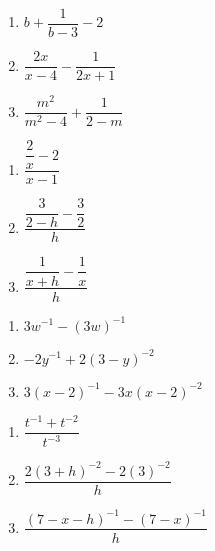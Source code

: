 \documentclass[11pt]{article}
\theoremstyle{definition}  %
\newcounter{HW}
\begin{document}
\begin{multicols}{3}
\begin{enumerate}
\setcounter{enumi}{\value{HW}}

\item  $b+ \dfrac{1}{b-3} - 2$
\item  $\dfrac{2x}{x-4} - \dfrac{1}{2x+1}$
\item  $\dfrac{m^2}{m^2-4} + \dfrac{1}{2-m}$

\setcounter{HW}{\value{enumi}}
\end{enumerate}
\end{multicols}

\begin{multicols}{3}
\begin{enumerate}
\setcounter{enumi}{\value{HW}}

\item $\dfrac{\dfrac{2}{x} - 2}{x-1}$
\item $\dfrac{\dfrac{3}{2-h} - \dfrac{3}{2}}{h}$
\item $\dfrac{\dfrac{1}{x+h} - \dfrac{1}{x}}{h}$

\setcounter{HW}{\value{enumi}}
\end{enumerate}
\end{multicols}


\begin{multicols}{3}
\begin{enumerate}
\setcounter{enumi}{\value{HW}}

\item  $3w^{-1} - (3w)^{-1}$
\item  $-2y^{-1}  + 2(3-y)^{-2}$
\item  $3(x-2)^{-1} - 3x(x-2)^{-2}$

 
\setcounter{HW}{\value{enumi}}
\end{enumerate}
\end{multicols}

\begin{multicols}{3}
\begin{enumerate}
\setcounter{enumi}{\value{HW}}

\item $\dfrac{t^{-1} + t^{-2}}{t^{-3}}$  
\item $\dfrac{2(3+h)^{-2} - 2(3)^{-2}}{h}$ 
\item $\dfrac{(7-x-h)^{-1} - (7-x)^{-1}}{h}$  \label{ratsimplast}


\setcounter{HW}{\value{enumi}}
\end{enumerate}
\end{multicols}
\end{document}
